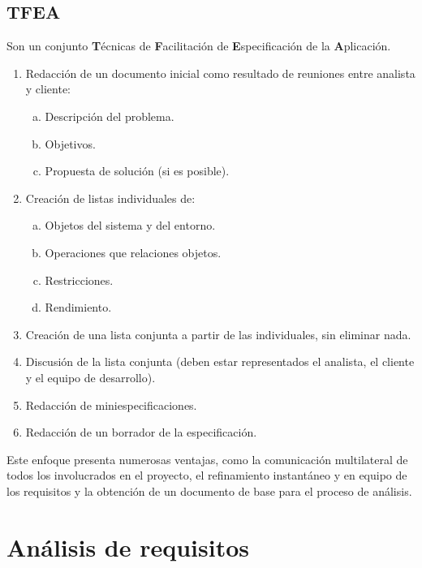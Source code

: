 \subsection{TFEA}
Son un conjunto \textbf{T}écnicas de \textbf{F}acilitación de \textbf{E}specificación de la \textbf{A}plicación.
\begin{enumerate}
    \item Redacción de un documento inicial como resultado de reuniones entre analista y cliente:
          \begin{enumerate}[a.]
              \item Descripción del problema.
              \item Objetivos.
              \item Propuesta de solución (si es posible).
          \end{enumerate}
    \item Creación de listas individuales de:
          \begin{enumerate}[a.]
              \item Objetos del sistema y del entorno.
              \item Operaciones que relaciones objetos.
              \item Restricciones.
              \item Rendimiento.
          \end{enumerate}
    \item Creación de una lista conjunta a partir de las individuales, sin eliminar nada.
    \item Discusión de la lista conjunta (deben estar representados el analista, el cliente y el equipo de desarrollo).
    \item Redacción de miniespecificaciones.
    \item Redacción de un borrador de la especificación.
\end{enumerate}
Este enfoque presenta numerosas ventajas, como la comunicación multilateral de todos los involucrados en el proyecto, el refinamiento instantáneo y en equipo de los requisitos y la obtención de un documento de base para el proceso de análisis.


\section{Análisis de requisitos}

